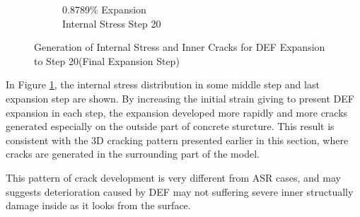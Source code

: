 \begin{figure}[h!]
\begin{subfigure}{.25\textwidth}
      \caption{0.8789\% Expansion\\Internal Stress Step 20}
    \end{subfigure}

\caption{Generation of Internal Stress and Inner Cracks for DEF Expansion to Step 20(Final Expansion Step)}
\label{fig:A30_X0C_stress}
\end{figure}

In Figure \ref{fig:A30_X0C_stress}, the internal stress distribution in some middle step and last expansion step are shown. By increasing the initial strain giving to present DEF expansion in each step, the expansion developed more rapidly and more cracks generated especially on the outside part of concrete sturcture. This result is consistent with the 3D cracking pattern presented earlier in this section, where cracks are generated in the surrounding part of the model.

This pattern of crack development is very different from ASR cases, and may suggests deterioration caused by DEF  may not suffering severe inner structually damage inside as it looks from the surface.
